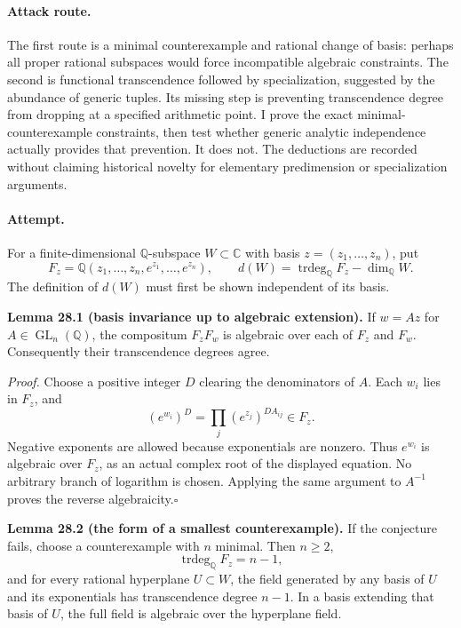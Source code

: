 \documentclass[11pt,a4paper]{article}
\newcommand{\Q}{\mathbb{Q}}
\newcommand{\C}{\mathbb{C}}
\numberwithin{equation}{section}
\begin{document}
\paragraph{Attack route.}
The first route is a minimal counterexample and rational change of basis:
perhaps all proper rational subspaces would force incompatible algebraic
constraints. The second is functional transcendence followed by
specialization, suggested by the abundance of generic tuples. Its missing
step is preventing transcendence degree from dropping at a specified
arithmetic point. I prove the exact minimal-counterexample constraints,
then test whether generic analytic independence actually provides that
prevention. It does not. The deductions are recorded without claiming
historical novelty for elementary predimension or specialization arguments.

\paragraph{Attempt.}
For a finite-dimensional $\Q$-subspace $W\subset\C$ with basis
$z=(z_1,\ldots,z_n)$, put
\[
 F_z=\Q(z_1,\ldots,z_n,e^{z_1},\ldots,e^{z_n}),\qquad
 d(W)=\operatorname{trdeg}_{\Q}F_z-\dim_{\Q}W.
\]
The definition of $d(W)$ must first be shown independent of its basis.

\textbf{Lemma 28.1 (basis invariance up to algebraic extension).}
If $w=Az$ for $A\in\operatorname{GL}_n(\Q)$, the compositum
$F_zF_w$ is algebraic over each of $F_z$ and $F_w$. Consequently their
transcendence degrees agree.

\emph{Proof.} Choose a positive integer $D$ clearing the denominators of
$A$. Each $w_i$ lies in $F_z$, and
\[
          (e^{w_i})^D=\prod_j(e^{z_j})^{DA_{ij}}\in F_z.
\]
Negative exponents are allowed because exponentials are nonzero. Thus
$e^{w_i}$ is algebraic over $F_z$, as an actual complex root of the
displayed equation. No arbitrary branch of logarithm is chosen. Applying
the same argument to $A^{-1}$ proves the reverse algebraicity.\hfill$\square$

\textbf{Lemma 28.2 (the form of a smallest counterexample).}
If the conjecture fails, choose a counterexample with $n$ minimal. Then
$n\ge2$,
\begin{equation}\label{r28:minimal}
                  \operatorname{trdeg}_{\Q}F_z=n-1,
\end{equation}
and for every rational hyperplane $U\subset W$, the field generated by
any basis of $U$ and its exponentials has transcendence degree $n-1$.
In a basis extending that basis of $U$, the full field is algebraic over
the hyperplane field.
\end{document}
